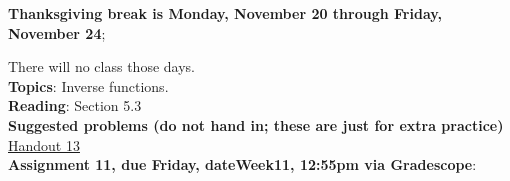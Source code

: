 \documentclass[12pt]{article}
\newcommand{\HWdueTime}{12:55pm }
\newcommand{\warning}{
\smallskip
\begin{center}
  {\color{red} {\huge\Stopsign} \hspace{1pt}  IN PROGRESS!} {\color{blue}Check back later for the final assignment.} {\color{red} {\huge\Stopsign} }
\end{center}
\smallskip
\AddToShipoutPictureBG*{\AtTextLowerLeft{\llap{\rotatebox[origin=lb]{90}{\large\sffamily\hspace{2.5in}
  {\color{red} {\huge\Stopsign} \hspace{1pt}  IN PROGRESS!} {\color{blue}Check back later for the final assignment.} {\color{red} {\huge\Stopsign} }
      }\quad\rule{0.8pt}{\textheight}\enspace}}}
}
\begin{document}

\noindent \textbf{Thanksgiving break is Monday, November 20 through Friday, November 24};

\noindent There will no class those days.
\\

\noindent \noindent\textbf{Topics}: Inverse functions.
\\

\noindent \textbf{Reading}: Section 5.3
\\

\noindent \textbf{Suggested problems (do not hand in; these are just for extra practice)} \href{https://www.math.emory.edu/~dzb/teaching/250Fall2021/handouts/250-H13-inverses.pdf}{Handout 13}
\\

\noindent \textbf{Assignment 11, due Friday, \csname dateWeek11\endcsname, \HWdueTime via Gradescope}:
\end{document}
